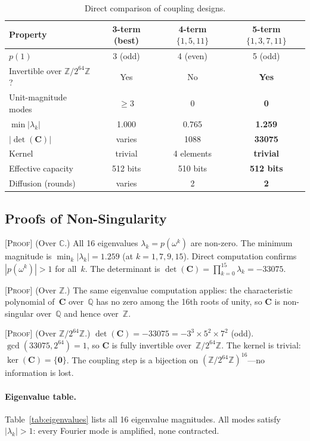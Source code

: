 \documentclass[runningheads]{llncs}
\newcommand{\proof}[1]{\textsc{[Proof]} #1}
\newcommand{\Ztwo}{\mathbb{Z}/2^{64}\mathbb{Z}}
\newcommand{\coupmat}{\mathbf{C}}
\begin{document}
\begin{table}[h]
\centering
\caption{Direct comparison of coupling designs.}
\label{tab:coupling-comparison}
\begin{tabular}{@{}lccc@{}}
\toprule
Property & 3-term (best) & 4-term $\{1,5,11\}$ & 5-term $\{1,3,7,11\}$ \\
\midrule
$p(1)$ & 3 (odd) & 4 (even) & 5 (odd) \\
Invertible over $\Ztwo$? & Yes & No & \textbf{Yes} \\
Unit-magnitude modes & $\geq 3$ & 0 & \textbf{0} \\
$\min|\lambda_k|$ & 1.000 & 0.765 & \textbf{1.259} \\
$|\det(\coupmat)|$ & varies & 1088 & \textbf{33075} \\
Kernel & trivial & 4 elements & \textbf{trivial} \\
Effective capacity & 512 bits & 510 bits & \textbf{512 bits} \\
Diffusion (rounds) & varies & 2 & \textbf{2} \\
\bottomrule
\end{tabular}
\end{table}

\subsection{Proofs of Non-Singularity}

\proof{(Over $\mathbb{C}$.)  All 16 eigenvalues $\lambda_k = p(\omega^k)$ are
non-zero.  The minimum magnitude is $\min_k |\lambda_k| = 1.259$ (at
$k = 1, 7, 9, 15$).  Direct computation confirms $|p(\omega^k)| > 1$ for all~$k$.
The determinant is $\det(\coupmat) = \prod_{k=0}^{15} \lambda_k = -33075$.}

\proof{(Over $\mathbb{Z}$.)  The same eigenvalue computation applies: the
characteristic polynomial of~$\coupmat$ over~$\mathbb{Q}$ has no zero among
the 16th roots of unity, so $\coupmat$ is non-singular over~$\mathbb{Q}$ and
hence over~$\mathbb{Z}$.}

\proof{(Over $\Ztwo$.)  $\det(\coupmat) = -33075 = -3^3 \times 5^2 \times 7^2$
(odd).  $\gcd(33075, 2^{64}) = 1$, so $\coupmat$ is fully invertible
over~$\Ztwo$.  The kernel is trivial: $\ker(\coupmat) = \{\mathbf{0}\}$.
The coupling step is a bijection on $(\Ztwo)^{16}$---no information is lost.}

\paragraph{Eigenvalue table.}
Table~\ref{tab:eigenvalues} lists all 16 eigenvalue magnitudes.  All modes
satisfy $|\lambda_k| > 1$: every Fourier mode is amplified, none contracted.
\end{document}
